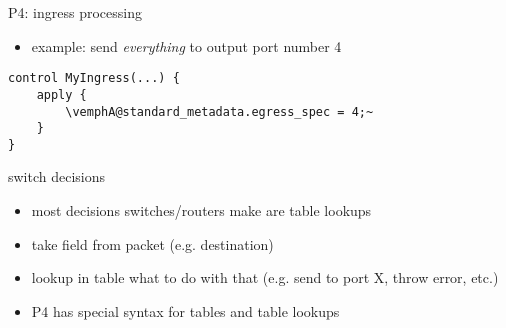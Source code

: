 \begin{frame}[fragile]{P4: ingress processing}
\providecommand{\vemphA}[1]{\myemph<2>{#1}}
\providecommand{\vemphB}[1]{\myemph<3>{#1}}
\providecommand{\vemphC}[1]{\myemph<4>{#1}}
\providecommand{\vemphD}[1]{\myemph<5>{#1}}
\begin{itemize}
\item example: send \textit{everything} to output port number 4
\end{itemize}
\begin{Verbatim}[fontsize=\small,commandchars=\\@~]
control MyIngress(...) {
    apply {
        \vemphA@standard_metadata.egress_spec = 4;~
    }
}
\end{Verbatim}
\end{frame}

\begin{frame}{switch decisions}
    \begin{itemize}
    \item most decisions switches/routers make are table lookups
    \vspace{.5cm}
    \item take field from packet (e.g. destination)
    \item lookup in table what to do with that
        (e.g. send to port X, throw error, etc.)
    \vspace{.5cm}
    \item P4 has special syntax for tables and table lookups
    \end{itemize}
\end{frame}

